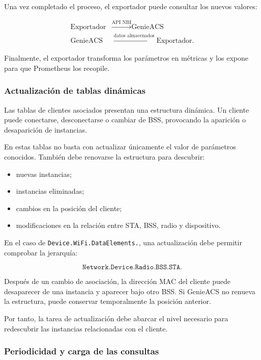 Una vez completado el proceso, el exportador puede consultar los nuevos
valores:

\[
\begin{aligned}
    \text{Exportador}
    &\xrightarrow{\text{API NBI}}
    \text{GenieACS}\\
    \text{GenieACS}
    &\xrightarrow{\text{datos almacenados}}
    \text{Exportador}.
\end{aligned}
\]

Finalmente, el exportador transforma los parámetros en métricas y los
expone para que Prometheus los recopile.


\subsubsection*{Actualización de tablas dinámicas}

Las tablas de clientes asociados presentan una estructura dinámica. Un
cliente puede conectarse, desconectarse o cambiar de BSS, provocando la
aparición o desaparición de instancias.

En estas tablas no basta con actualizar únicamente el valor de parámetros
conocidos. También debe renovarse la estructura para descubrir:

\begin{itemize}
    \item nuevas instancias;
    \item instancias eliminadas;
    \item cambios en la posición del cliente;
    \item modificaciones en la relación entre STA, BSS, radio y
    dispositivo.
\end{itemize}

En el caso de \texttt{Device.WiFi.DataElements.}, una actualización debe
permitir comprobar la jerarquía:

\[
    \texttt{Network.Device.Radio.BSS.STA}.
\]

Después de un cambio de asociación, la dirección MAC del cliente puede
desaparecer de una instancia y aparecer bajo otro BSS. Si GenieACS no
renueva la estructura, puede conservar temporalmente la posición
anterior.

Por tanto, la tarea de actualización debe abarcar el nivel necesario para
redescubrir las instancias relacionadas con el cliente.


\subsubsection*{Periodicidad y carga de las consultas}

